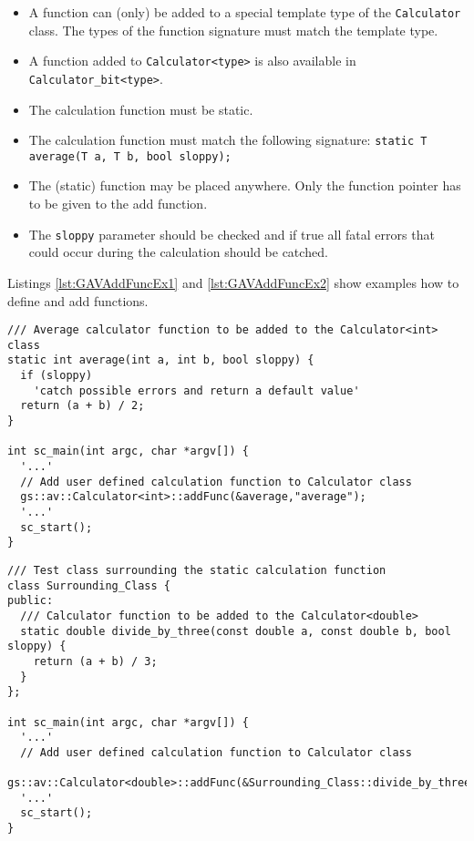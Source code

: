 \begin{itemize}
  \item A function can (only) be added to a special template type of the \lstinline|Calculator| class. The types of the function signature must match the template type.

  \item A function added to \lstinline|Calculator<type>| is also available in \lstinline|Calculator_bit<type>|.
 
  \item The calculation function must be static.

  \item The calculation function must match the following signature: \newline
  	\lstinline[language= TeX]|static T average(T a, T b, bool sloppy);|
	
  \item The (static) function may be placed anywhere. Only the function pointer has to be given to the add function.

  \item The \lstinline|sloppy| parameter should be checked and if {\sffamily true} all fatal errors that could occur during the calculation should be catched. 
\end{itemize}

Listings \ref{lst:GAVAddFuncEx1} and \ref{lst:GAVAddFuncEx2} show examples how to define and add functions.

\begin{lstlisting}[caption={[User defined calculation function.]User defined calculation function. The \lstinline|average|-function will be usable by any \lstinline[language=TeX]|Calculator<int>| and \lstinline[language=TeX]|Calculator\_bit<int>|.}, label=lst:GAVAddFuncEx1]
/// Average calculator function to be added to the Calculator<int> class
static int average(int a, int b, bool sloppy) {
  if (sloppy)
    'catch possible errors and return a default value'
  return (a + b) / 2;
}

int sc_main(int argc, char *argv[]) {
  '...'
  // Add user defined calculation function to Calculator class
  gs::av::Calculator<int>::addFunc(&average,"average"); 
  '...'
  sc_start();
}
\end{lstlisting}

\begin{lstlisting}[caption={[User defined calculation function within class.]User defined calculation function within class. The \lstinline|average|-function will be usable by any \lstinline[language=TeX]|Calculator<double>| and \lstinline[language=TeX]|Calculator\_bit<double>|.}, label=lst:GAVAddFuncEx2]
/// Test class surrounding the static calculation function
class Surrounding_Class {
public:
  /// Calculator function to be added to the Calculator<double>
  static double divide_by_three(const double a, const double b, bool sloppy) {
    return (a + b) / 3;
  }
};

int sc_main(int argc, char *argv[]) {
  '...'
  // Add user defined calculation function to Calculator class
  gs::av::Calculator<double>::addFunc(&Surrounding_Class::divide_by_three,"div3"); 
  '...'
  sc_start();
}
\end{lstlisting}


